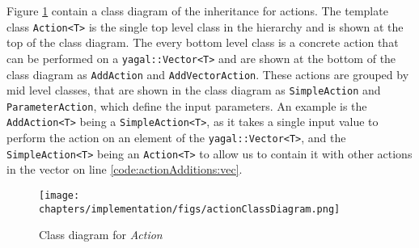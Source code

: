 Figure \ref{fig:actionClassDiagram} contain a class diagram of the inheritance for actions. The template class \texttt{Action<T>} is the single top level class in the hierarchy and is shown at the top of the class diagram. The every bottom level class is a concrete action that can be performed on a \texttt{yagal::Vector<T>} and are shown at the bottom of the class diagram as \texttt{AddAction} and \texttt{AddVectorAction}. These actions are grouped by mid level classes, that are shown in the class diagram as \texttt{SimpleAction} and \texttt{ParameterAction}, which define the input parameters. An example is the \texttt{AddAction<T>} being a \texttt{SimpleAction<T>}, as it takes a single input value to perform the action on an element of the \texttt{yagal::Vector<T>}, and the \texttt{SimpleAction<T>} being an \texttt{Action<T>} to allow us to contain it with other actions in the vector on line \ref{code:actionAdditions:vec}.

\begin{figure}[!htb]
    \centering
    \texttt{[image: chapters/implementation/figs/actionClassDiagram.png]}
    \caption{Class diagram for \textit{Action}}
    \label{fig:actionClassDiagram}
\end{figure}
